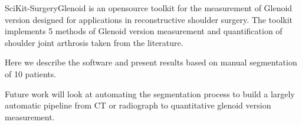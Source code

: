 
SciKit-SurgeryGlenoid is an opensource toolkit for the measurement of Glenoid version 
designed for applications in reconstructive shoulder surgery. The toolkit implements
5 methods of Glenoid version measurement and quantification of shoulder joint 
arthrosis taken from the literature. 

Here we describe the software and present results based on manual segmentation of 10 
patients. 

Future work will look at automating the segmentation process to build a largely automatic
pipeline from {CT} or radiograph to quantitative glenoid version measurement.
